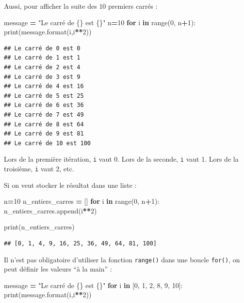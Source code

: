 \documentclass[12pt,]{book}
\newenvironment{Shaded}{\begin{snugshade}}{\end{snugshade}}
\newcommand{\KeywordTok}[1]{\textcolor[rgb]{0.13,0.29,0.53}{\textbf{#1}}}
\newcommand{\DecValTok}[1]{\textcolor[rgb]{0.00,0.00,0.81}{#1}}
\newcommand{\SpecialCharTok}[1]{\textcolor[rgb]{0.00,0.00,0.00}{#1}}
\newcommand{\StringTok}[1]{\textcolor[rgb]{0.31,0.60,0.02}{#1}}
\newcommand{\ControlFlowTok}[1]{\textcolor[rgb]{0.13,0.29,0.53}{\textbf{#1}}}
\newcommand{\OperatorTok}[1]{\textcolor[rgb]{0.81,0.36,0.00}{\textbf{#1}}}
\newcommand{\BuiltInTok}[1]{#1}
\newcommand{\NormalTok}[1]{#1}
\numberwithin{equation}{section}
\numberwithin{countremarque}{section}
\begin{document}
Aussi, pour afficher la suite des \(10\) premiers carrés :

\begin{Shaded}
\begin{Highlighting}[]
\NormalTok{message }\OperatorTok{=} \StringTok{"Le carré de }\SpecialCharTok{\{\}}\StringTok{ est }\SpecialCharTok{\{\}}\StringTok{"} 
\NormalTok{n}\OperatorTok{=}\DecValTok{10}
\ControlFlowTok{for}\NormalTok{ i }\KeywordTok{in} \BuiltInTok{range}\NormalTok{(}\DecValTok{0}\NormalTok{, n}\OperatorTok{+}\DecValTok{1}\NormalTok{):}
  \BuiltInTok{print}\NormalTok{(message.}\BuiltInTok{format}\NormalTok{(i,i}\OperatorTok{**}\DecValTok{2}\NormalTok{))}
\end{Highlighting}
\end{Shaded}

\begin{lstlisting}
## Le carré de 0 est 0
## Le carré de 1 est 1
## Le carré de 2 est 4
## Le carré de 3 est 9
## Le carré de 4 est 16
## Le carré de 5 est 25
## Le carré de 6 est 36
## Le carré de 7 est 49
## Le carré de 8 est 64
## Le carré de 9 est 81
## Le carré de 10 est 100
\end{lstlisting}

Lors de la première itération, \texttt{i} vaut 0. Lors de la seconde,
\texttt{i} vaut 1. Lors de la troisième, \texttt{i} vaut 2, etc.

Si on veut stocker le résultat dans une liste :

\begin{Shaded}
\begin{Highlighting}[]
\NormalTok{n}\OperatorTok{=}\DecValTok{10}
\NormalTok{n_entiers_carres }\OperatorTok{=}\NormalTok{ []}
\ControlFlowTok{for}\NormalTok{ i }\KeywordTok{in} \BuiltInTok{range}\NormalTok{(}\DecValTok{0}\NormalTok{, n}\OperatorTok{+}\DecValTok{1}\NormalTok{):}
\NormalTok{  n_entiers_carres.append(i}\OperatorTok{**}\DecValTok{2}\NormalTok{)}
  
\BuiltInTok{print}\NormalTok{(n_entiers_carres)}
\end{Highlighting}
\end{Shaded}

\begin{lstlisting}
## [0, 1, 4, 9, 16, 25, 36, 49, 64, 81, 100]
\end{lstlisting}

Il n'est pas obligatoire d'utiliser la fonction \texttt{range()} dans
une boucle \texttt{for()}, on peut définir les valeurs ``à la main'' :

\begin{Shaded}
\begin{Highlighting}[]
\NormalTok{message }\OperatorTok{=} \StringTok{"Le carré de }\SpecialCharTok{\{\}}\StringTok{ est }\SpecialCharTok{\{\}}\StringTok{"}
\ControlFlowTok{for}\NormalTok{ i }\KeywordTok{in}\NormalTok{ [}\DecValTok{0}\NormalTok{, }\DecValTok{1}\NormalTok{, }\DecValTok{2}\NormalTok{, }\DecValTok{8}\NormalTok{, }\DecValTok{9}\NormalTok{, }\DecValTok{10}\NormalTok{]:}
  \BuiltInTok{print}\NormalTok{(message.}\BuiltInTok{format}\NormalTok{(i,i}\OperatorTok{**}\DecValTok{2}\NormalTok{))}
\end{Highlighting}
\end{Shaded}
\end{document}
